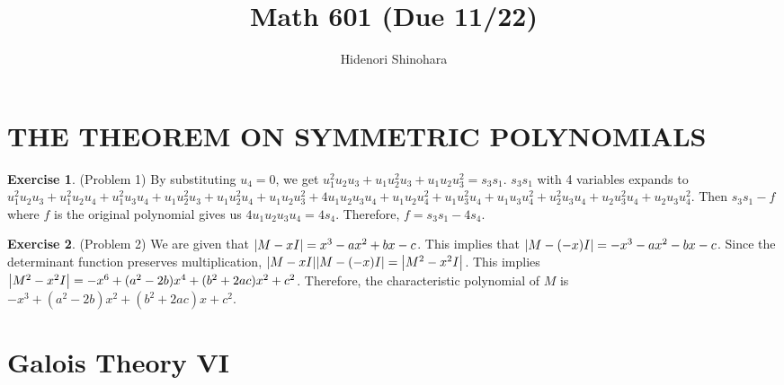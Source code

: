 \documentclass[12pt, psamsfonts]{amsart}
\theoremstyle{definition}
\newtheorem*{exer}{Exercise}
\theoremstyle{remark}
\numberwithin{equation}{section}
\begin{document}
\title{Math 601 (Due 11/22)}
\author{Hidenori Shinohara}
\maketitle

\tableofcontents
\section{THE THEOREM ON SYMMETRIC POLYNOMIALS}

\begin{exer}{(Problem 1)}
  By substituting $u_4 = 0$, we get $u_1^2u_2u_3 + u_1u_2^2u_3 + u_1u_2u_3^2 = s_3s_1$.
  $s_3s_1$ with 4 variables expands to $u_{1}^{2} u_{2} u_{3} + u_{1}^{2} u_{2} u_{4} + u_{1}^{2} u_{3} u_{4} + u_{1} u_{2}^{2} u_{3} + u_{1} u_{2}^{2} u_{4} + u_{1} u_{2} u_{3}^{2} + 4 u_{1} u_{2} u_{3} u_{4} + u_{1} u_{2} u_{4}^{2} + u_{1} u_{3}^{2} u_{4} + u_{1} u_{3} u_{4}^{2} + u_{2}^{2} u_{3} u_{4} + u_{2} u_{3}^{2} u_{4} + u_{2} u_{3} u_{4}^{2}$.
  Then $s_3s_1 - f$ where $f$ is the original polynomial gives us $4u_1u_2u_3u_4 = 4s_4$.
  Therefore, $f = s_3s_1 - 4s_4$.
\end{exer}

\begin{exer}{(Problem 2)}
  We are given that $\abs{M - xI} = x^3 - ax^2 + bx - c$.
  This implies that $\abs{M - (-x)I} = -x^3 - ax^2 - bx - c$.
  Since the determinant function preserves multiplication, $\abs{M - xI}\abs{M - (-x)I} = \abs{M^2 - x^2I}$.
  This implies $\abs{M^2 - x^2I} = -x^6 + (a^2 - 2b)x^4 + (b^2 + 2ac)x^2 + c^2$.
  Therefore, the characteristic polynomial of $M$ is $-x^3 + (a^2 - 2b)x^2 + (b^2 + 2ac)x + c^2$.
\end{exer}

\section{Galois Theory VI}
\end{document}
